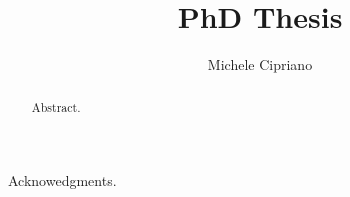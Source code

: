 \documentclass[oneside]{sapthesis}
\title{PhD Thesis}
\author{Michele Cipriano}
\begin{document}
\frontmatter

\maketitle

\dedication{Dedication.}

\begin{acknowledgments}
Acknowedgments.
\end{acknowledgments}

\begin{abstract}
Abstract.
\end{abstract}

\tableofcontents

\mainmatter








\appendix




\backmatter
\cleardoublepage
{}

\end{document}
